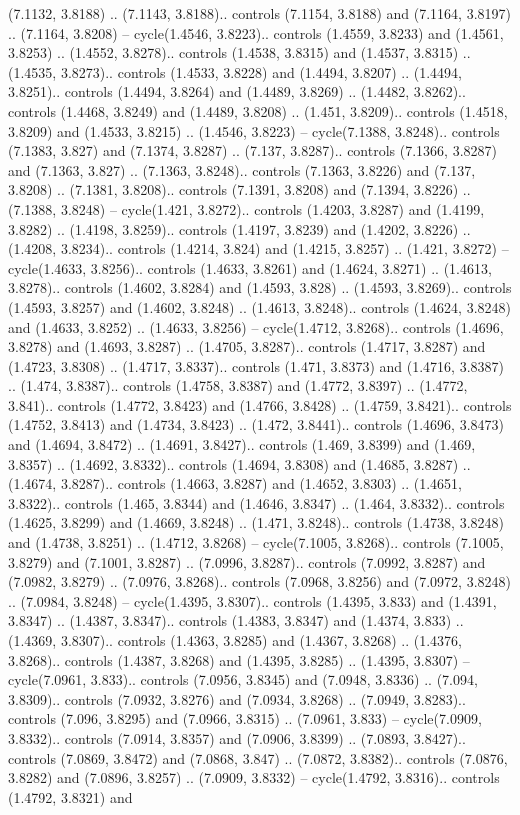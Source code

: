 (7.1132, 3.8188) .. (7.1143, 3.8188).. controls (7.1154, 3.8188) and (7.1164, 3.8197) .. (7.1164, 3.8208) -- cycle(1.4546, 3.8223).. controls (1.4559, 3.8233) and (1.4561, 3.8253) .. (1.4552, 3.8278).. controls (1.4538, 3.8315) and (1.4537, 3.8315) .. (1.4535, 3.8273).. controls (1.4533, 3.8228) and (1.4494, 3.8207) .. (1.4494, 3.8251).. controls (1.4494, 3.8264) and (1.4489, 3.8269) .. (1.4482, 3.8262).. controls (1.4468, 3.8249) and (1.4489, 3.8208) .. (1.451, 3.8209).. controls (1.4518, 3.8209) and (1.4533, 3.8215) .. (1.4546, 3.8223) -- cycle(7.1388, 3.8248).. controls (7.1383, 3.827) and (7.1374, 3.8287) .. (7.137, 3.8287).. controls (7.1366, 3.8287) and (7.1363, 3.827) .. (7.1363, 3.8248).. controls (7.1363, 3.8226) and (7.137, 3.8208) .. (7.1381, 3.8208).. controls (7.1391, 3.8208) and (7.1394, 3.8226) .. (7.1388, 3.8248) -- cycle(1.421, 3.8272).. controls (1.4203, 3.8287) and (1.4199, 3.8282) .. (1.4198, 3.8259).. controls (1.4197, 3.8239) and (1.4202, 3.8226) .. (1.4208, 3.8234).. controls (1.4214, 3.824) and (1.4215, 3.8257) .. (1.421, 3.8272) -- cycle(1.4633, 3.8256).. controls (1.4633, 3.8261) and (1.4624, 3.8271) .. (1.4613, 3.8278).. controls (1.4602, 3.8284) and (1.4593, 3.828) .. (1.4593, 3.8269).. controls (1.4593, 3.8257) and (1.4602, 3.8248) .. (1.4613, 3.8248).. controls (1.4624, 3.8248) and (1.4633, 3.8252) .. (1.4633, 3.8256) -- cycle(1.4712, 3.8268).. controls (1.4696, 3.8278) and (1.4693, 3.8287) .. (1.4705, 3.8287).. controls (1.4717, 3.8287) and (1.4723, 3.8308) .. (1.4717, 3.8337).. controls (1.471, 3.8373) and (1.4716, 3.8387) .. (1.474, 3.8387).. controls (1.4758, 3.8387) and (1.4772, 3.8397) .. (1.4772, 3.841).. controls (1.4772, 3.8423) and (1.4766, 3.8428) .. (1.4759, 3.8421).. controls (1.4752, 3.8413) and (1.4734, 3.8423) .. (1.472, 3.8441).. controls (1.4696, 3.8473) and (1.4694, 3.8472) .. (1.4691, 3.8427).. controls (1.469, 3.8399) and (1.469, 3.8357) .. (1.4692, 3.8332).. controls (1.4694, 3.8308) and (1.4685, 3.8287) .. (1.4674, 3.8287).. controls (1.4663, 3.8287) and (1.4652, 3.8303) .. (1.4651, 3.8322).. controls (1.465, 3.8344) and (1.4646, 3.8347) .. (1.464, 3.8332).. controls (1.4625, 3.8299) and (1.4669, 3.8248) .. (1.471, 3.8248).. controls (1.4738, 3.8248) and (1.4738, 3.8251) .. (1.4712, 3.8268) -- cycle(7.1005, 3.8268).. controls (7.1005, 3.8279) and (7.1001, 3.8287) .. (7.0996, 3.8287).. controls (7.0992, 3.8287) and (7.0982, 3.8279) .. (7.0976, 3.8268).. controls (7.0968, 3.8256) and (7.0972, 3.8248) .. (7.0984, 3.8248) -- cycle(1.4395, 3.8307).. controls (1.4395, 3.833) and (1.4391, 3.8347) .. (1.4387, 3.8347).. controls (1.4383, 3.8347) and (1.4374, 3.833) .. (1.4369, 3.8307).. controls (1.4363, 3.8285) and (1.4367, 3.8268) .. (1.4376, 3.8268).. controls (1.4387, 3.8268) and (1.4395, 3.8285) .. (1.4395, 3.8307) -- cycle(7.0961, 3.833).. controls (7.0956, 3.8345) and (7.0948, 3.8336) .. (7.094, 3.8309).. controls (7.0932, 3.8276) and (7.0934, 3.8268) .. (7.0949, 3.8283).. controls (7.096, 3.8295) and (7.0966, 3.8315) .. (7.0961, 3.833) -- cycle(7.0909, 3.8332).. controls (7.0914, 3.8357) and (7.0906, 3.8399) .. (7.0893, 3.8427).. controls (7.0869, 3.8472) and (7.0868, 3.847) .. (7.0872, 3.8382).. controls (7.0876, 3.8282) and (7.0896, 3.8257) .. (7.0909, 3.8332) -- cycle(1.4792, 3.8316).. controls (1.4792, 3.8321) and 